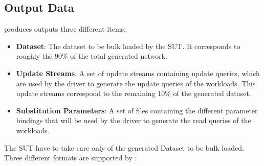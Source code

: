 %
%

\subsection{Output Data}

\datagen produces outputs three different items:
\begin{itemize}
  \item \textbf{Dataset}: The dataset to be bulk loaded by the SUT. It
    corresponds to roughly the 90\% of the total generated network.
  \item \textbf{Update Streams}: A set of update streams containing update
    queries, which are used by the driver to generate the update queries of the
    workloads. This update
    streams correspond to the remaining 10\% of the generated dataset.
  \item \textbf{Substitution Parameters}: A set of files containing the
    different parameter bindings that will be used by the driver to generate the
    read queries of the workloads.
\end{itemize}

The SUT have to take care only of the generated Dataset to be bulk loaded.
Three different formats are supported by \datagen:


